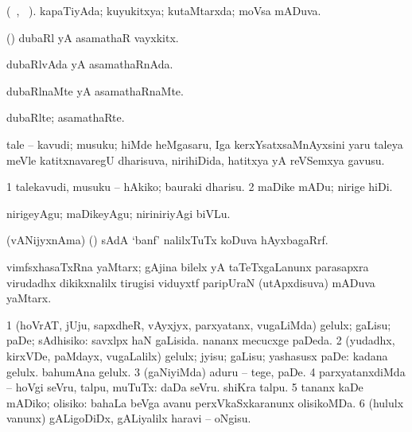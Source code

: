 {{{{{{\bentry
{}
\gl{\saMkiSx}
\bmng
{} 
\emng
\eentry

\bentry
{}
  \gl{\gu} (\tara\ , \tama\ ).\bmng
kapaTiyAda; kuyukitxya; kutaMtarxda; moVsa mADuva. 
\emng
\eentry

\bentry
{}
  \gl{\nA}\bmng
(\AmA) dubaRl yA asamathaR vayxkitx. 
\emng
\eentry

\bentry
{}
  \gl{\gu}\bmng
dubaRlvAda yA asamathaRnAda. 
\emng
\eentry

\bentry
{}
  \gl{\kirxvi}\bmng
dubaRlnaMte yA asamathaRnaMte. 
\emng
\eentry

\bentry
{}
  \gl{\nA}\bmng
dubaRlte; asamathaRte. 
\emng
\eentry

\bentry
{} 
\gl{\nA}
\expl{}
\bmng
tale -- kavudi; musuku; hiMde heMgasaru, Iga kerxYsatxsaMnAyxsini yaru taleya meVle katitxnavaregU dharisuva, nirihiDida, hatitxya yA reVSemxya gavusu. 
\emng
\eentry

\bentry
{} 
\gl{\sakirx}
\expl{}
\bmng
\bnum
\num{1} talekavudi, musuku -- hAkiko; bauraki dharisu. 
\num{2} maDike mADu; nirige hiDi. 
\enum
\emng

\noindent 
\gl{\akirx}
\expl{}
\bmng
nirigeyAgu; maDikeyAgu; niriniriyAgi biVLu. 
\emng
\eentry

\bentry
{} 
\gl{\gu}
\expl{}
\bmng
{} 
\emng
\eentry

\bentry
{} 
\gl{\nA}
\bmng
(vANijyxnAma) (\AmA) sAdA `banf' nalilxTuTx koDuva hAyxbagaRrf. 
\emng
\eentry

\bentry
{} 
\gl{\nA}
\bmng
vimfsxhasaTxRna yaMtarx; gAjina bilelx yA taTeTxgaLanunx parasapxra virudadhx dikikxnalilx tirugisi viduyxtf paripUraN (utApxdisuva) mADuva yaMtarx. 
\emng
\eentry

\bentry
{} 
\gl{\sakirx}
\expl{}
\bmng
\bnum
\num{1} (hoVrAT, jUju, sapxdheR, vAyxjyx, parxyatanx, \mo vugaLiMda) gelulx; gaLisu; paDe; sAdhisiko:  savxlpx haN gaLisida.  nananx mecucxge paDeda. 
\num{2} (yudadhx, kirxVDe, paMdayx, \mo vugaLalilx) gelulx; jyisu; gaLisu; yashasusx paDe:  kadana gelulx.  bahumAna gelulx. 
\num{3} (gaNiyiMda) aduru -- tege, paDe. 
\num{4} parxyatanxdiMda -- hoVgi seVru, talpu, muTuTx:  daDa seVru.  shiKra talpu. 
\num{5} tananx kaDe mADiko; olisiko:  bahaLa beVga avanu perxVkaSxkaranunx olisikoMDa. 
\num{6} (hululx \mo vanunx) gALigoDiDx, gALiyalilx haravi -- oNgisu. 
\enum
\emng

}}}}}}
